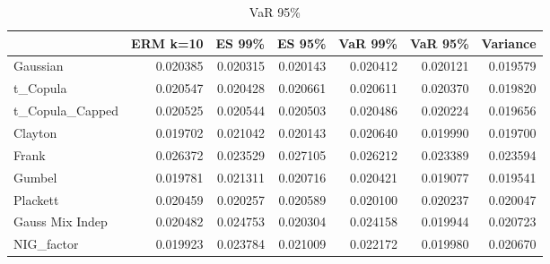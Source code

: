 \begin{table}
            \centering
\begin{tabular}{lrrrrrr}
\toprule
{} &  ERM k=10 &    ES 99\% &    ES 95\% &   VaR 99\% &   VaR 95\% &  Variance \\
\midrule
Gaussian        &  0.020385 &  0.020315 &  \color{green}0.020143 &  0.020412 &  0.020121 &  \color{blue}0.019579 \\
t\_Copula        &  0.020547 &  0.020428 &  0.020661 &  0.020611 &  0.020370 &  \color{blue}0.019820 \\
t\_Copula\_Capped &  0.020525 &  0.020544 &  0.020503 &  0.020486 &  0.020224 &  \color{blue}0.019656 \\
Clayton         &  \color{green}0.019702 &  0.021042 &  0.020143 &  0.020640 &  0.019990 &  \color{blue}0.019700 \\
Frank           &  0.026372 &  0.023529 &  0.027105 &  0.026212 &  \color{blue}0.023389 &  0.023594 \\
Gumbel          &  0.019781 &  0.021311 &  0.020716 &  0.020421 &  \color{red}0.019077 &  \color{green}0.019541 \\
Plackett        &  0.020459 &  \color{green}0.020257 &  0.020589 &  \color{green}0.020100 &  0.020237 &  \color{blue}0.020047 \\
Gauss Mix Indep &  0.020482 &  0.024753 &  0.020304 &  0.024158 &  \color{blue}0.019944 &  0.020723 \\
NIG\_factor      &  \color{blue}0.019923 &  0.023784 &  0.021009 &  0.022172 &  0.019980 &  0.020670 \\
\bottomrule
\end{tabular}
\caption{VaR 95\%}
\end{table}

